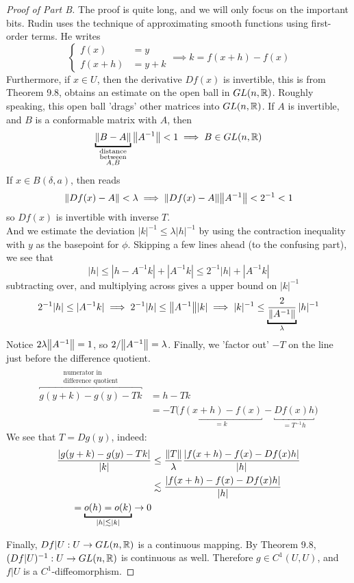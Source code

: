 \documentclass[../main-manifolds.tex]{subfiles}
\begin{document}
\begin{proof}[Proof of Part B]
    The proof is quite long, and we will only focus on the important bits. Rudin uses the technique of approximating smooth functions using first-order terms. He writes
    \[
        \begin{cases}
            f(x) &= y \\
            f(x+h) &= y+k
        \end{cases}
        \implies k = f(x+h) - f(x)
    \]
    Furthermore, if $x\in U$, then the derivative $Df(x)$ is invertible, this is from Theorem 9.8, obtains an estimate on the open ball in $GL(n,\mathbb{R})$. Roughly speaking, this open ball 'drags' other matrices into $GL(n,\mathbb{R})$. If $A$ is invertible, and $B$ is a conformable matrix with $A$, then
    \[
    \underbracket{\norm{B-A}}_{\substack{\text{distance} \\ \text{between}\\ A, B}}\norm{A^{-1}}<1\implies B\in GL(n,\real)
    \]
    If $x\in B(\delta, a)$, then  reads 
    \[
        \norm{Df(x) - A}<\lambda\implies \norm{Df(x) - A}\norm{A^{-1}}<2^{-1}<1
    \]
    so $Df(x)$ is invertible with inverse $T$.\\

    And we estimate the deviation $|k|^{-1}\leq \lambda|h|^{-1}$ by using the contraction inequality with $y$ as the basepoint for $\phi$. Skipping a few lines ahead (to the confusing part), we see that
    \[
        |h|\leq |h-A^{-1}k| + |A^{-1}k|\leq 2^{-1}|h| + |A^{-1}k|
    \]
    subtracting over, and multiplying across gives a upper bound on $|k|^{-1}$
    \[
        2^{-1}|h|\leq |A^{-1}k|\implies 2^{-1}|h|\leq\norm{A^{-1}}|k|\implies |k|^{-1}\leq \underbracket{\dfrac{2}{\norm{A^{-1}}}}_{\lambda}|h|^{-1}
    \]
    Notice $2\lambda\norm{A^{-1}}=1$, so $2/\norm{A^{-1}}=\lambda$. Finally, we 'factor out' $-T$ on the line just before the difference quotient.
    \begin{align*}
        \overbracket{g(y+k)-g(y) - Tk}^{\substack{\text{numerator in }\\ \text{difference quotient}}} &= h - Tk \\[1ex]
        &= -T\biggl(\underbracket{f(x+h) - f(x)}_{=k} - \underbracket{Df(x)h}_{=T^{-1}h}\biggr)
    \end{align*}
    We see that $T = Dg(y)$, indeed:
    \begin{align*}
        \dfrac{|g(y+k)-g(y)- Tk|}{|k|}&\leq\dfrac{\norm{T}}{\lambda}\dfrac{|f(x+h)-f(x)-Df(x)h|}{|h|}\\
        &\Lsim \dfrac{|f(x+h)-f(x)-Df(x)h|}{|h|} \\
        = \underbracket{o(h) = o(k)}_{|h|\Lsim |k|}\to 0
\end{align*}

Finally, $Df|U: U\to GL(n,\mathbb{R})$ is a continuous mapping. By Theorem 9.8, $(Df|U)^{-1}: U\to GL(n,\mathbb{R})$ is continuous as well. Therefore $g\in C^1(U,U)$, and $f|U$ is a $C^1$-diffeomorphism.
\end{proof}
\end{document}
